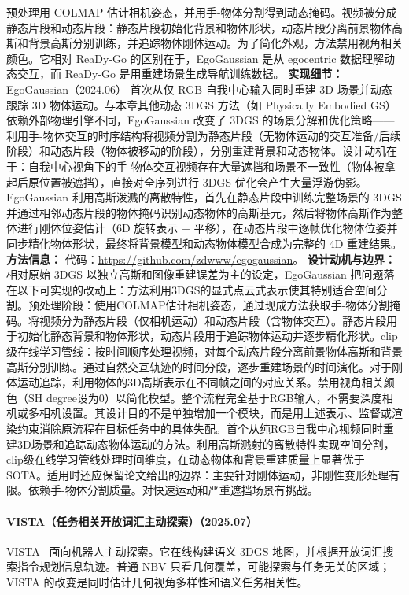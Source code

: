 预处理用 COLMAP 估计相机姿态，并用手-物体分割得到动态掩码。视频被分成静态片段和动态片段：静态片段初始化背景和物体形状，动态片段分离前景物体高斯和背景高斯分别训练，并追踪物体刚体运动。为了简化外观，方法禁用视角相关颜色。它相对 ReaDy-Go 的区别在于，EgoGaussian 是从 egocentric 数据理解动态交互，而 ReaDy-Go 是用重建场景生成导航训练数据。
\textbf{实现细节：} EgoGaussian（2024.06） 首次从仅 RGB 自我中心输入同时重建 3D 场景并动态跟踪 3D 物体运动。与本章其他动态 3DGS 方法（如 Physically Embodied GS）依赖外部物理引擎不同，EgoGaussian 改变了 3DGS 的场景分解和优化策略——利用手-物体交互的时序结构将视频分割为静态片段（无物体运动的交互准备/后续阶段）和动态片段（物体被移动的阶段），分别重建背景和动态物体。设计动机在于：自我中心视角下的手-物体交互视频存在大量遮挡和场景不一致性（物体被拿起后原位置被遮挡），直接对全序列进行 3DGS 优化会产生大量浮游伪影。EgoGaussian 利用高斯泼溅的离散特性，首先在静态片段中训练完整场景的 3DGS 并通过相邻动态片段的物体掩码识别动态物体的高斯基元，然后将物体高斯作为整体进行刚体位姿估计（6D 旋转表示 + 平移），在动态片段中逐帧优化物体位姿并同步精化物体形状，最终将背景模型和动态物体模型合成为完整的 4D 重建结果。
\textbf{方法信息：} 代码：\url{https://github.com/zdwww/egogaussian}。
\textbf{设计动机与边界：} 相对原始 3DGS 以独立高斯和图像重建误差为主的设定，EgoGaussian 把问题落在以下可实现的改动上：方法利用3DGS的显式点云式表示使其特别适合空间分割。预处理阶段：使用COLMAP估计相机姿态，通过现成方法获取手-物体分割掩码。将视频分为静态片段（仅相机运动）和动态片段（含物体交互）。静态片段用于初始化静态背景和物体形状，动态片段用于追踪物体运动并逐步精化形状。clip级在线学习管线：按时间顺序处理视频，对每个动态片段分离前景物体高斯和背景高斯分别训练。通过自然交互轨迹的时间分段，逐步重建场景的时间演化。对于刚体运动追踪，利用物体的3D高斯表示在不同帧之间的对应关系。禁用视角相关颜色（SH degree设为0）以简化模型。整个流程完全基于RGB输入，不需要深度相机或多相机设置。其设计目的不是单独增加一个模块，而是用上述表示、监督或渲染约束消除原流程在目标任务中的具体失配。首个从纯RGB自我中心视频同时重建3D场景和追踪动态物体运动的方法。利用高斯溅射的离散特性实现空间分割，clip级在线学习管线处理时间维度，在动态物体和背景重建质量上显著优于SOTA。适用时还应保留论文给出的边界：主要针对刚体运动，非刚性变形处理有限。依赖手-物体分割质量。对快速运动和严重遮挡场景有挑战。
\paragraph{VISTA（任务相关开放词汇主动探索）（2025.07）}
VISTA~\cite{2507_01125} 面向机器人主动探索。它在线构建语义 3DGS 地图，并根据开放词汇搜索指令规划信息轨迹。普通 NBV 只看几何覆盖，可能探索与任务无关的区域；VISTA 的改变是同时估计几何视角多样性和语义任务相关性。

